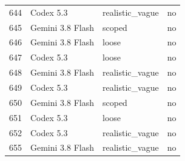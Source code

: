 \begin{tabular}{llll}
644 & Codex 5.3 & realistic\_vague & no \\
645 & Gemini 3.8 Flash & scoped & no \\
646 & Gemini 3.8 Flash & loose & no \\
647 & Codex 5.3 & loose & no \\
648 & Gemini 3.8 Flash & realistic\_vague & no \\
649 & Codex 5.3 & realistic\_vague & no \\
650 & Gemini 3.8 Flash & scoped & no \\
651 & Codex 5.3 & loose & no \\
652 & Codex 5.3 & realistic\_vague & no \\
655 & Gemini 3.8 Flash & realistic\_vague & no \\
\bottomrule
\end{tabular}
